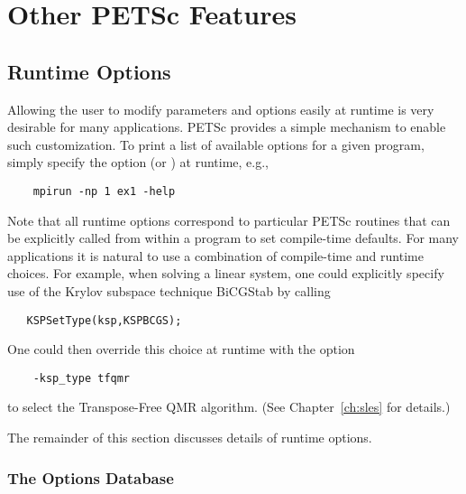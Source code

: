 \chapter{Other PETSc Features}

\section{Runtime Options}  
\label{sec:options}

Allowing the user to modify parameters and options easily at runtime
is very desirable for many applications.  PETSc provides a simple
mechanism to enable such customization.  To print a list of
available options for a given program, simply specify the option 
 (or ) at runtime, e.g.,  
\begin{verbatim}
    mpirun -np 1 ex1 -help
\end{verbatim}

Note that all runtime options correspond to particular PETSc routines
that can be explicitly called from within a program to set compile-time
defaults.   For many applications it is natural to use a combination
of compile-time and runtime choices.  For example, when solving a linear
system, one could explicitly specify use of the Krylov subspace
technique BiCGStab by calling
\begin{verbatim}
   KSPSetType(ksp,KSPBCGS);
\end{verbatim}
One could then override this choice at runtime with the option
\begin{verbatim}
    -ksp_type tfqmr
\end{verbatim}
to select the Transpose-Free QMR algorithm. (See Chapter~\ref{ch:sles} for details.)

The remainder of this section discusses details of runtime options.

\subsection{The Options Database}

